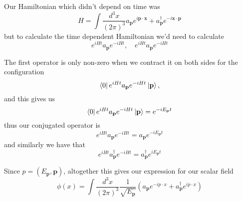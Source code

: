Our Hamiltonian which didn't depend on time was\[ H = \int \frac{d^3 x }{(2 \pi)^3} a_{\mathbf{p}}e^{i \mathbf{p} \cdot \mathbf{x}}+ a_{\mathbf{p}}^\dagger e^{-i \mathbf{x} \cdot \mathbf{p}}
\] 
but to calculate the time dependent Hamiltonian we'd need to calculate 
\[ e^{i H t }a_\mathbf{p} e^{ - i H t}, \quad e^{iHt} a_\mathbf{p}e^{ - i H t} \]

The first operator is only non-zero when we contract it on both sides for the configuration 
\[ \bra{0}e^{i H t}a_{\mathbf{p}} e^{ - iHt} \ket{\mathbf{p}},\]  and this gives us 
\[ \bra{0}e^{iH t }a_{\mathbf{p}}e^{- iH t }\ket{\mathbf{p}} = e^{ - i E_{\mathbf{p}} t} \] 
thus our conjugated operator is 
\[ e^{iHt}a_\mathbf{p}e^{ - iHt}  = a_{\mathbf{p}}e^{ -i E_\mathbf{p}t} \] and similarly we have that 
\[ e^{ iHt}a_\mathbf{p}^\dagger e^{ - iHt}  = a_{\mathbf{p}}^\dagger e^{i E_\mathbf{p} t} \] 

Since $ p  = (E_\mathbf{p}, \mathbf{p})$, altogether this gives our expression for our scalar field 
\[
\phi (x) = \int \frac{d^3 x }{(2 \pi)^3} \frac{1}{\sqrt{E_\mathbf{p}}} \left( a_\mathbf{p}e^{ -i p \cdot x} + a_\mathbf{p}^\dagger e^{i p \cdot x} \right) 
\]


\pagebreak 

